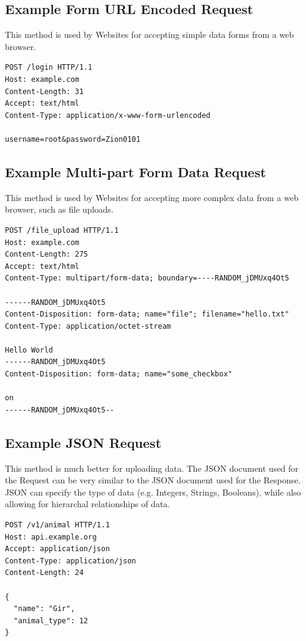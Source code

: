\documentclass{book}
\begin{document}
\subsection{Example Form URL Encoded Request}

This method is used by Websites for accepting simple data forms from a web browser.

\begin{verbatim}
POST /login HTTP/1.1
Host: example.com
Content-Length: 31
Accept: text/html
Content-Type: application/x-www-form-urlencoded

username=root&password=Zion0101
\end{verbatim}

\subsection{Example Multi-part Form Data Request}

This method is used by Websites for accepting more complex data from a web browser, such as file uploads.

\begin{verbatim}
POST /file_upload HTTP/1.1
Host: example.com
Content-Length: 275
Accept: text/html
Content-Type: multipart/form-data; boundary=----RANDOM_jDMUxq4Ot5

------RANDOM_jDMUxq4Ot5
Content-Disposition: form-data; name="file"; filename="hello.txt"
Content-Type: application/octet-stream

Hello World
------RANDOM_jDMUxq4Ot5
Content-Disposition: form-data; name="some_checkbox"

on
------RANDOM_jDMUxq4Ot5--
\end{verbatim}

\subsection{Example JSON Request}

This method is much better for uploading data. The JSON document used for the Request can be very similar to the JSON document used for the Response. JSON can specify the type of data (e.g. Integers, Strings, Booleans), while also allowing for hierarchal relationships of data.

\begin{verbatim}
POST /v1/animal HTTP/1.1
Host: api.example.org
Accept: application/json
Content-Type: application/json
Content-Length: 24

{
  "name": "Gir",
  "animal_type": 12
}
\end{verbatim}
\end{document}
